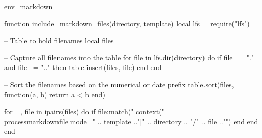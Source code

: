 \startenvironment env_markdown

\startluacode
function include_markdown_files(directory, template)
	local lfs = require("lfs")

	-- Table to hold filenames
	local files = {}

	-- Capture all filenames into the table
	for file in lfs.dir(directory) do
		if file ~= "." and file ~= ".." then
			table.insert(files, file)
		end
	end

	-- Sort the filenames based on the numerical or date prefix
	table.sort(files, function(a, b)
			return a < b
	end)

	for _, file in ipairs(files) do
		if file:match("%
			context("\\processmarkdownfile[mode=" .. template .."]{" .. directory .. "/" .. file .."}")
		end
	end
end
\stopluacode

\usemodule[filter]



\stopenvironment
